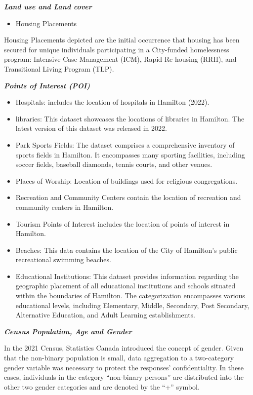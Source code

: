 \documentclass[
11pt, %
oneside, %
english, %
singlespacing, %
]{macthesis} %
\def\tightlist{}
\begin{document}
\textbf{\emph{Land use and Land cover}}

\begin{itemize}
\tightlist
\item
  Housing Placements
\end{itemize}

Housing Placements depicted are the initial occurrence that housing has been secured for unique individuals participating in a City-funded homelessness program: Intensive Case Management (ICM), Rapid Re-housing (RRH), and Transitional Living Program (TLP).

\textbf{\emph{Points of Interest (POI)}}

\begin{itemize}
\item
  Hospitals: includes the location of hospitals in Hamilton (2022).
\item
  libraries: This dataset showcases the locations of libraries in Hamilton. The latest version of this dataset was released in 2022.
\item
  Park Sports Fields: The dataset comprises a comprehensive inventory of sports fields in Hamilton. It encompasses many sporting facilities, including soccer fields, baseball diamonds, tennis courts, and other venues.
\item
  Places of Worship: Location of buildings used for religious congregations.
\item
  Recreation and Community Centers contain the location of recreation and community centers in Hamilton.
\item
  Tourism Points of Interest includes the location of points of interest in Hamilton.
\item
  Beaches: This data contains the location of the City of Hamilton's public recreational swimming beaches.
\item
  Educational Institutions: This dataset provides information regarding the geographic placement of all educational institutions and schools situated within the boundaries of Hamilton. The categorization encompasses various educational levels, including Elementary, Middle, Secondary, Post Secondary, Alternative Education, and Adult Learning establishments.
\end{itemize}

\textbf{\emph{Census Population, Age and Gender}}

In the 2021 Census, Statistics Canada introduced the concept of gender. Given that the non-binary population is small, data aggregation to a two-category gender variable was necessary to protect the responses' confidentiality. In these cases, individuals in the category ``non-binary persons'' are distributed into the other two gender categories and are denoted by the ``+'' symbol.
\end{document}
